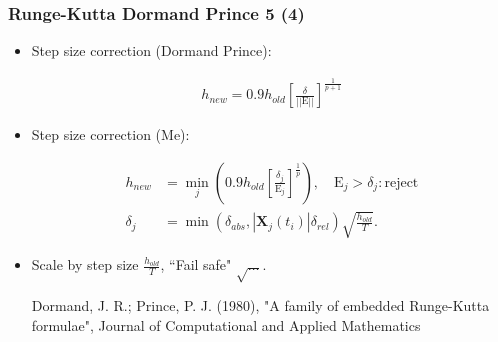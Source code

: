 \documentclass{beamer}
\begin{document}
\begin{frame}
\frametitle{Runge-Kutta Dormand Prince 5 (4)}

\begin{itemize}
\item <1-> Step size correction (Dormand Prince):

\begin{align*}
h_{new} = 0.9 h_{old} \left[\frac{\delta }{||\mathrm{E}||}\right]^{\frac{1}{p+1}}
\end{align*}

\item <2-> Step size correction (Me):

\begin{align*}
h_{new} &= \min_j \left(0.9 h_{old} \left[\frac{\delta_j}{\mathrm{E}_{j}}\right]^{\frac{1}{p}}\right), \quad \mathrm{E}_j>\delta_j : \mathrm{reject}\\
\delta_j &=\min(\delta_{abs},|\mathbf{X}_j(t_{i})|\delta_{rel})\sqrt{\frac{h_{old}}{T}}.
\end{align*}

\item <3-> Scale by step size $\frac{h_{old}}{T}$, ``Fail safe" $\sqrt{\ldots}$.

{\color{gray} Dormand, J. R.; Prince, P. J. (1980), "A family of embedded Runge-Kutta formulae", Journal of Computational and Applied Mathematics}
\end{itemize}
\end{frame}
\end{document}

